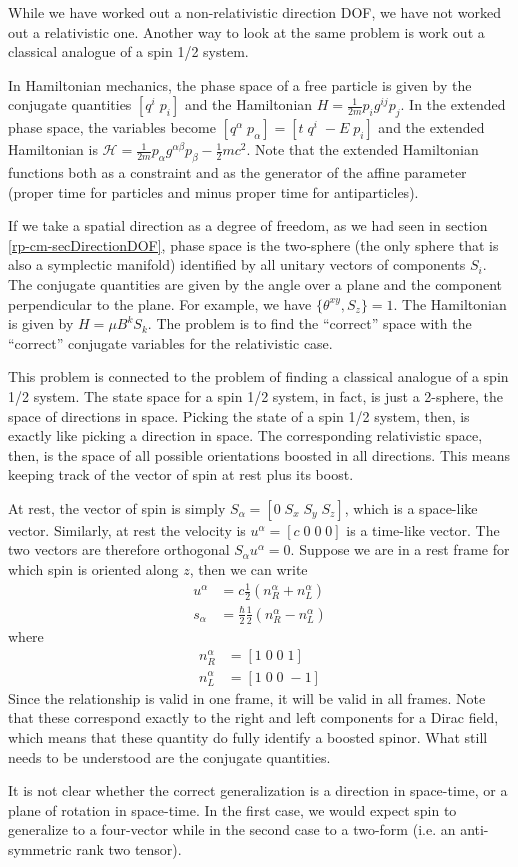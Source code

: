 {While we have worked out a non-relativistic direction DOF, we have not worked out a relativistic one. Another way to look at the same problem is work out a classical analogue of a spin 1/2 system.}

In Hamiltonian mechanics, the phase space of a free particle
is given by the conjugate quantities $[ q^i \; p_i ]$ and the Hamiltonian
$H=\frac{1}{2m} p_i g^{ij}p_j$. In the extended phase space, the variables become
$[q^\alpha \; p_\alpha]=[ t \; q^i \; -E \; p_i]$ and the extended Hamiltonian is
$\mathcal{H}=\frac{1}{2m} p_\alpha g^{\alpha\beta}p_\beta - \frac{1}{2}mc^2$. Note that
the extended Hamiltonian functions both as a constraint and as the generator
of the affine parameter (proper time for particles and minus proper time
for antiparticles).

If we take a spatial direction as a degree of freedom, as we had seen in section \ref{rp-cm-secDirectionDOF}, phase space is the two-sphere (the only sphere that is also a symplectic manifold) identified by all
unitary vectors of components $S_i$. The conjugate quantities are given by the angle over a plane and the component perpendicular to the plane. For example, we have $\{\theta^{xy}, S_z\}=1$. The Hamiltonian
is given by $H=\mu B^{k}S_k$. The problem is to find the ``correct'' space with the ``correct'' conjugate variables
for the relativistic case.

This problem is connected to the problem of finding a classical analogue of a spin 1/2 system. The state space for a spin 1/2 system, in fact, is just a 2-sphere, the space of directions in space. Picking the state of a spin 1/2 system, then, is exactly like picking a direction in space. The corresponding relativistic space, then, is the space of all possible orientations boosted in all directions. This means keeping track of the vector of spin at rest plus its boost.

At rest, the vector of spin is simply $S_\alpha = [ 0 \; S_x \; S_y \; S_z ]$, which is a space-like vector. Similarly, at rest the velocity is $u^\alpha = [c \; 0 \; 0 \; 0]$ is a time-like vector. The two vectors are therefore orthogonal $S_\alpha u^\alpha = 0$. Suppose we are in a rest frame for which spin is oriented along $z$, then we can write
\begin{align*}
	u^\alpha &= c \frac{1}{2} (n_R^\alpha + n_L^\alpha) \\
	s_\alpha &= \frac{\hbar}{2} \frac{1}{2} (n_R^\alpha - n_L^\alpha)
\end{align*}
where 
\begin{align*}
	n_R^\alpha &= [ 1 \; 0 \; 0 \; 1 ] \\
	n_L^\alpha &= [ 1 \; 0 \; 0 \; -1 ]
\end{align*}
Since the relationship is valid in one frame, it will be valid in all frames. Note that these correspond exactly to the right and left components for a Dirac field, which means that these quantity do fully identify a boosted spinor. What still needs to be understood are the conjugate quantities.

It is not clear whether the correct generalization is a direction in space-time, or a plane of rotation
in space-time. In the first case, we would expect spin to generalize to a four-vector
while in the second case to a two-form (i.e. an anti-symmetric rank two tensor).

\fi
